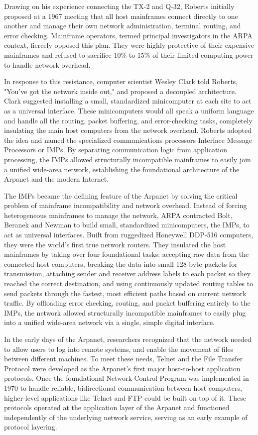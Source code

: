 Drawing on his experience connecting the TX-2 and Q-32, Roberts initially proposed at a 1967 meeting that all host mainframes connect directly to one another and manage their own network administration, terminal routing, and error checking. Mainframe operators, termed principal investigators in the ARPA context, fiercely opposed this plan. They were highly protective of their expensive mainframes and refused to sacrifice 10\% to 15\% of their limited computing power to handle network overhead. 

In response to this resistance, computer scientist Wesley Clark told Roberts, "You've got the network inside out," and proposed a decoupled architecture. Clark suggested installing a small, standardized minicomputer at each site to act as a universal interface. These minicomputers would all speak a uniform language and handle all the routing, packet buffering, and error-checking tasks, completely insulating the main host computers from the network overhead. Roberts adopted the idea and named the specialized communications processors Interface Message Processors or IMPs. By separating communication logic from application processing, the IMPs allowed structurally incompatible mainframes to easily join a unified wide-area network, establishing the foundational architecture of the Arpanet and the modern Internet.

The IMPs became the defining feature of the Arpanet by solving the critical problem of mainframe incompatibility and network overhead. Instead of forcing heterogeneous mainframes to manage the network, ARPA contracted Bolt, Beranek and Newman to build small, standardized minicomputers, the IMPs, to act as universal interfaces. Built from ruggedized Honeywell DDP-516 computers, they were the world's first true network routers. They insulated the host mainframes by taking over four foundational tasks: accepting raw data from the connected host computers, breaking the data into small 128-byte packets for transmission, attaching sender and receiver address labels to each packet so they reached the correct destination, and using continuously updated routing tables to send packets through the fastest, most efficient paths based on current network traffic. By offloading error checking, routing, and packet buffering entirely to the IMPs, the network allowed structurally incompatible mainframes to easily plug into a unified wide-area network via a single, simple digital interface.

In the early days of the Arpanet, researchers recognized that the network needed to allow users to log into remote systems, and enable the movement of files between different machines. To meet these needs, Telnet and the File Transfer Protocol were developed as the Arpanet's first major host-to-host application protocols. Once the foundational Network Control Program was implemented in 1970 to handle reliable, bidirectional communication between host computers, higher-level applications like Telnet and FTP could be built on top of it. These protocols operated at the application layer of the Arpanet and functioned independently of the underlying network service, serving as an early example of protocol layering.

